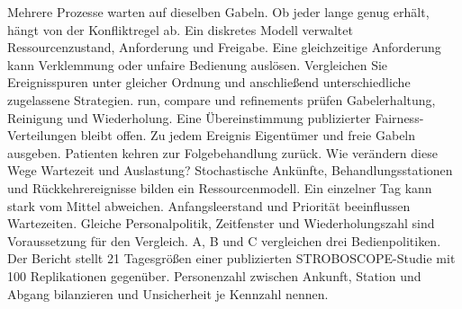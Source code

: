 Mehrere Prozesse warten auf dieselben Gabeln. Ob jeder lange genug erhält, hängt von der Konfliktregel ab.
Ein diskretes Modell verwaltet Ressourcenzustand, Anforderung und Freigabe.
Eine gleichzeitige Anforderung kann Verklemmung oder unfaire Bedienung auslösen.
Vergleichen Sie Ereignisspuren unter gleicher Ordnung und anschließend unterschiedliche zugelassene Strategien.
run, compare und refinements prüfen Gabelerhaltung, Reinigung und Wiederholung. Eine Übereinstimmung publizierter Fairness-Verteilungen bleibt offen.
Zu jedem Ereignis Eigentümer und freie Gabeln ausgeben.
Patienten kehren zur Folgebehandlung zurück. Wie verändern diese Wege Wartezeit und Auslastung?
Stochastische Ankünfte, Behandlungsstationen und Rückkehrereignisse bilden ein Ressourcenmodell.
Ein einzelner Tag kann stark vom Mittel abweichen. Anfangsleerstand und Priorität beeinflussen Wartezeiten.
Gleiche Personalpolitik, Zeitfenster und Wiederholungszahl sind Voraussetzung für den Vergleich.
A, B und C vergleichen drei Bedienpolitiken. Der Bericht stellt 21 Tagesgrößen einer publizierten STROBOSCOPE-Studie mit 100 Replikationen gegenüber.
Personenzahl zwischen Ankunft, Station und Abgang bilanzieren und Unsicherheit je Kennzahl nennen.
